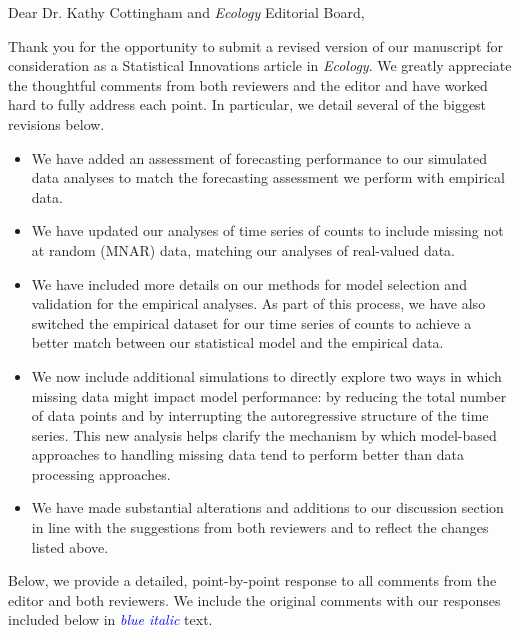 \documentclass{article}
\begin{document}
\begin{linenumbers}

\noindent Dear Dr. Kathy Cottingham and \textit{Ecology} Editorial Board,

\bigskip %


\noindent Thank you for the opportunity to submit a revised version of our manuscript  for consideration as a Statistical Innovations article in \textit{Ecology}. We greatly appreciate the thoughtful comments from both reviewers and the editor and have worked hard to fully address each point. In particular, we detail several of the biggest revisions below.

\bigskip

\begin{itemize}
    \item We have added an assessment of forecasting performance to our simulated data analyses to match the forecasting assessment we perform with empirical data. 
    \item We have updated our analyses of time series of counts to include missing not at random (MNAR) data, matching our analyses of real-valued data.
    \item We have included more details on our methods for model selection and validation for the empirical analyses. As part of this process, we have also switched the empirical dataset for our time series of counts to achieve a better match between our statistical model and the empirical data.
    \item We now include additional simulations to directly explore two ways in which missing data might impact model performance: by reducing the total number of data points and by interrupting the autoregressive structure of the time series. This new analysis helps clarify the mechanism by which model-based approaches to handling missing data tend to perform better than data processing approaches.
    \item We have made substantial alterations and additions to our discussion section in line with the suggestions from both reviewers and to reflect the changes listed above.
\end{itemize}

\noindent Below, we provide a detailed, point-by-point response to all comments from the editor and both reviewers. We include the original comments with our responses included below in \textcolor{blue}{\textit{blue italic}} text.

\bigskip


\end{linenumbers}
\end{document}
